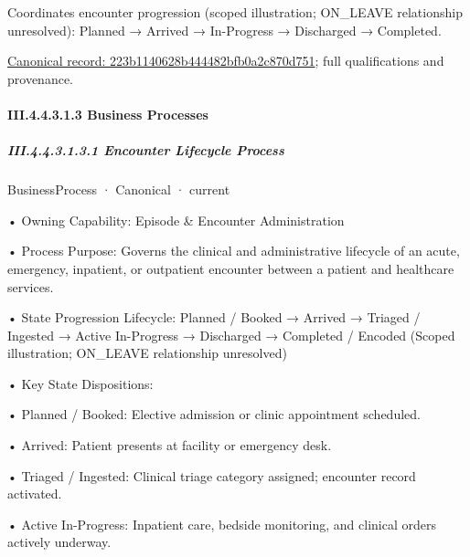 Coordinates encounter progression (scoped illustration; ON\_LEAVE relationship unresolved): Planned → Arrived → In-Progress → Discharged → Completed.


{\footnotesize \href{../../../../../../../continuum/business/business-function/223b1140628b444482bfb0a2c870d751.md}{Canonical record: 223b1140628b444482bfb0a2c870d751}; full qualifications and provenance.}\par
\paragraph*{III.4.4.3.1.3 Business Processes}
\label{navigation:III.4.4.3.1.3}

\subparagraph*{III.4.4.3.1.3.1 Encounter Lifecycle Process}
\label{navigation:III.4.4.3.1.3.1}

\label{element:df49e2e8bb3748f3abbdd1c28ae1be8f}
{\small BusinessProcess · Canonical · current}\par

•
Owning Capability: Episode \& Encounter Administration



•
Process Purpose: Governs the clinical and administrative lifecycle of an acute, emergency, inpatient, or outpatient encounter between a patient and healthcare services.



•
State Progression Lifecycle: Planned / Booked → Arrived → Triaged / Ingested → Active In-Progress → Discharged → Completed / Encoded   (Scoped illustration; ON\_LEAVE relationship unresolved)



•
Key State Dispositions:



•
Planned / Booked: Elective admission or clinic appointment scheduled.



•
Arrived: Patient presents at facility or emergency desk.



•
Triaged / Ingested: Clinical triage category assigned; encounter record activated.



•
Active In-Progress: Inpatient care, bedside monitoring, and clinical orders actively underway.



